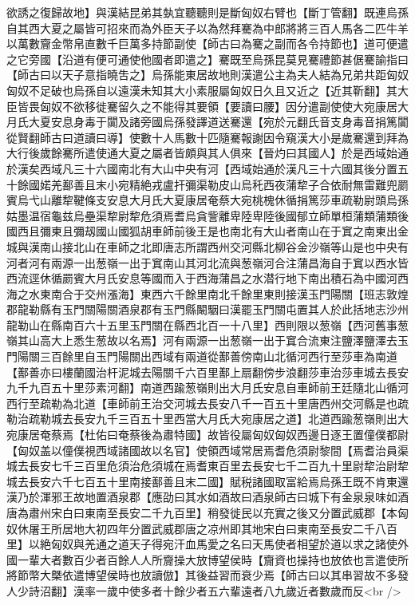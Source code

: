 欲誘之復歸故地】與漢結昆弟其埶宜聽聽則是斷匈奴右臂也【斷丁管翻】既連烏孫自其西大夏之屬皆可招來而為外臣天子以為然拜騫為中郎將將三百人馬各二匹牛羊以萬數齎金幣帛直數千巨萬多持節副使【師古曰為騫之副而各令持節也】道可便遣之它旁國【沿道有便可通使他國者即遣之】騫既至烏孫昆莫見騫禮節甚倨騫諭指曰【師古曰以天子意指曉吿之】烏孫能東居故地則漢遣公主為夫人結為兄弟共距匈奴匈奴不足破也烏孫自以遠漢未知其大小素服屬匈奴日久且又近之【近其靳翻】其大臣皆畏匈奴不欲移徙騫留久之不能得其要領【要讀曰腰】因分遣副使使大宛康居大月氏大夏安息身毒于闐及諸旁國烏孫發譯道送騫還【宛於元翻氏音支身毒音捐篤闐從賢翻師古曰道讀曰導】使數十人馬數十匹隨騫報謝因令窺漢大小是歲騫還到拜為大行後歲餘騫所遣使通大夏之屬者皆頗與其人俱來【晉灼曰其國人】於是西域始通於漢矣西域凡三十六國南北有大山中央有河【西域始通於漢凡三十六國其後分置五十餘國婼羌鄯善且末小宛精絶戎盧扞彌渠勒皮山烏秅西夜蒲犂子合依耐無雷難兜罽賓烏弋山離犂鞬條支安息大月氏大夏康居奄蔡大宛桃槐休循捐篤莎車疏勒尉頭烏孫姑墨温宿龜兹烏壘渠犂尉犂危須焉耆烏貪訾離卑陸卑陸後國郁立師單桓蒲類蒲類後國西且彌東且彌刼國山國狐胡車師前後王是也南北有大山者南山在于窴之南東出金城與漢南山接北山在車師之北即唐志所謂西州交河縣北柳谷金沙嶺等山是也中央有河者河有兩源一出葱嶺一出于窴南山其河北流與葱嶺河合注蒲昌海自于窴以西水皆西流逕休循罽賓大月氏安息等國而入于西海蒲昌之水潜行地下南出積石為中國河西海之水東南合于交州漲海】東西六千餘里南北千餘里東則接漢玉門陽關【班志敦煌郡龍勒縣有玉門關陽關酒泉郡有玉門縣闞駰曰漢罷玉門關屯置其人於此括地志沙州龍勒山在縣南百六十五里玉門關在縣西北百一十八里】西則限以葱嶺【西河舊事葱嶺其山高大上悉生葱故以名焉】河有兩源一出葱嶺一出于窴合流東注鹽澤鹽澤去玉門陽關三百餘里自玉門陽關出西域有兩道從鄯善傍南山北循河西行至莎車為南道【鄯善亦曰樓蘭國治杆泥城去陽關千六百里鄯上扇翻傍步浪翻莎車治莎車城去長安九千九百五十里莎素河翻】南道西踰葱嶺則出大月氏安息自車師前王廷隨北山循河西行至疏勒為北道【車師前王治交河城去長安八千一百五十里唐西州交河縣是也疏勒治疏勒城去長安九千三百五十里西當大月氏大宛康居之道】北道西踰葱嶺則出大宛康居奄蔡焉【杜佑曰奄蔡後為肅特國】故皆役屬匈奴匈奴西邊日逐王置僮僕都尉【匈奴盖以僮僕視西域諸國故以名官】使領西域常居焉耆危須尉黎間【焉耆治員渠城去長安七千三百里危須治危須城在焉耆東百里去長安七千二百九十里尉犂治尉犂城去長安六千七百五十里南接鄯善且末二國】賦税諸國取富給焉烏孫王既不肯東還漢乃於渾邪王故地置酒泉郡【應劭曰其水如酒故曰酒泉師古曰城下有金泉泉味如酒唐為肅州宋白曰東南至長安二千九百里】稍發徙民以充實之後又分置武威郡【本匈奴休屠王所居地大初四年分置武威郡唐之凉州即其地宋白曰東南至長安二千八百里】以絶匈奴與羌通之道天子得宛汗血馬愛之名曰天馬使者相望於道以求之諸使外國一輩大者數百少者百餘人人所齎操大放博望侯時【齎資也操持也放依也言遣使所將節幣大槩依遣博望侯時也放讀倣】其後益習而衰少焉【師古曰以其串習故不多發人少詩沼翻】漢率一歲中使多者十餘少者五六輩遠者八九歲近者數歲而反<br />
